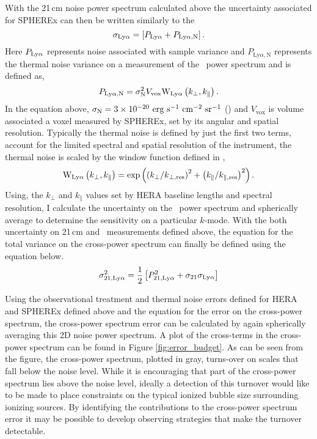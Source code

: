 With the 21\,cm noise power spectrum calculated above the uncertainty associated for SPHEREx can then be written similarly to the
\begin{equation}
  \sigma_{\rm Ly\alpha} = \left[ P_{\rm Ly\alpha} + P_{\textrm{Ly}\alpha, \textrm{N}} \right].
\end{equation}
Here $P_{\rm Ly\alpha}$ represents noise associated with sample variance and
 $P_{\textrm{Ly}\alpha, \textrm{N}}$ represents the thermal noise variance
on a measurement of the \lya\ power spectrum and is defined as,
\begin{equation}
P_{\textrm{Ly}\alpha, \textrm{N}} = \sigma_{\rm N}^2 V_{\text{vox}} \textrm{W}_{\rm Ly\alpha}\left(k_{\perp}, k_{\parallel}\right).
\end{equation}
In the equation above, $\sigma_{\rm N} = 3 \times 10^{-20} \ {\rm erg \ s^{-1} \ cm^{-2} \ sr^{-1}}$ (\cite{2016arXiv160607039D})
and $V_{\text{vox}}$ is volume associated a voxel measured by SPHEREx,
set by its angular and spatial resolution.
Typically the thermal noise is defined by just the first two terms, account for
the limited spectral and spatial resolution of the instrument, the thermal noise
is scaled by the window function defined in \cite{2011ApJ...741...70L},
\begin{equation}
  \textrm{W}_{\rm Ly\alpha}\left( k_{\perp}, k_{\parallel} \right) = \exp \left(\left( k_{\perp} / k_{\perp, \textrm{res}}\right)^2 + \left( k_{\parallel} / k_{\parallel, \textrm{res}}\right)^2\right).
\end{equation}
Using, the $k_{\perp}$ and $k_{\parallel}$ values set by HERA baseline lengths
and spectral resolution, I calculate the uncertainty on the \lya\ power spectrum
and spherically average to determine the sensitivity on a particular $k$-mode.
With the both uncertainty on 21\,cm and \lya\ measurements defined above, the equation
for the total variance on the cross-power spectrum can finally be defined using the equation below.
\begin{equation}
    \sigma^2_{21, \rm Ly\alpha} = \frac{1}{2} \left[ P^2_{21, \rm Ly\alpha} + \sigma_{21} \sigma_{\rm Ly\alpha} \right]
\end{equation}

Using the observational treatment and thermal noise errors defined for HERA and SPHEREx
defined above and the equation for the error on the cross-power spectrum, the cross-power spectrum
error can be calculated by again spherically averaging this 2D noise power spectrum. A plot of
the cross-terms in the cross-power spectrum can be found in Figure \ref{fig:error_budget}.
As can be seen from the figure, the cross-power spectrum, plotted in gray, turns-over
on scales that fall below the noise level. While it is encouraging that part of the cross-power
spectrum lies above the noise level, ideally a detection of this turnover would
like to be made to place constraints on the typical ionized bubble size surrounding
ionizing sources. By identifying the contributions to the cross-power spectrum error
it may be possible to develop observing strategies that make the turnover detectable.

